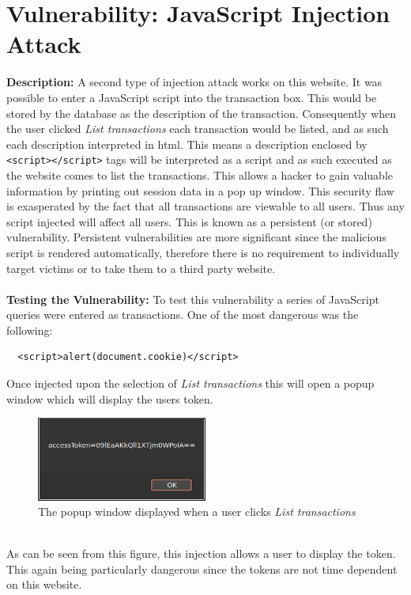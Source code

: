 \section{Vulnerability: JavaScript Injection Attack}
\label{sec:background}
\textbf{Description:} A second type of injection attack works on this website. It was possible to enter a JavaScript script into the transaction box. This would be stored by
the database as the description of the transaction. Consequently when the user clicked \textit{List transactions} each transaction would be listed, and as such each description
interpreted in html. This means a description enclosed by \verb|<script></script>| tags will be interpreted as a script and as such executed as the website comes to list the
transactions. This allows a hacker to gain valuable information by printing out session data in a pop up window. This security flaw is exasperated by the fact that all transactions
are viewable to all users. Thus any script injected will affect all users. This is known as a persistent (or stored) vulnerability. Persistent vulnerabilities are more significant
since the malicious script is rendered automatically, therefore there is no requirement to individually target victims or to take them to a third party website.\\ \\
\textbf{Testing the Vulnerability:} To test this vulnerability a series of JavaScript queries were entered as transactions. One of the most dangerous was the following:
\begin{verbatim}
  <script>alert(document.cookie)</script>
\end{verbatim}
Once injected upon the selection of \textit{List transactions} this will open a popup window which will display the users token.
\begin{figure}[h]
  \centering
  \includegraphics[width=0.5\textwidth]{figs/popup.png}
  \caption{The popup window displayed when a user clicks \textit{List transactions}}
  \label{popup}
\end{figure}\\
As can be seen from this figure, this injection allows a user to display the token. This again being particularly dangerous since the tokens are not time dependent on this website.
